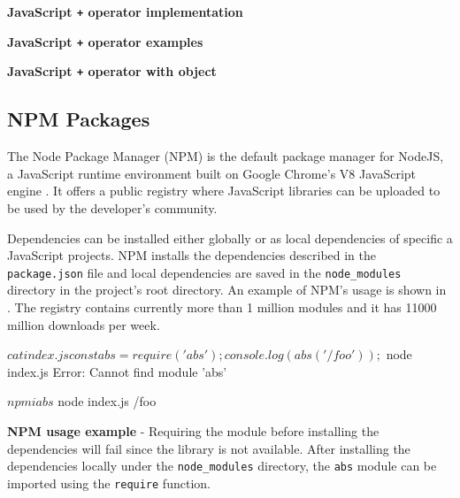 \begin{code}
	\captionsetup{aboveskip=0pt, belowskip=10pt}
	\caption[JavaScript + operator implementation]{\textbf{JavaScript \texttt{+} operator implementation}}
	\label{code:background-plus-operator-implementation}
\end{code}

\begin{code}
	\captionsetup{aboveskip=0pt, belowskip=10pt}
	\caption[JavaScript + operator examples]{\textbf{JavaScript \texttt{+} operator examples}}
	\label{code:background-plus-operator-simple-examples}
\end{code}

\begin{code}
	\captionsetup{aboveskip=0pt, belowskip=10pt}
	\caption[JavaScript + operator with object]{\textbf{JavaScript \texttt{+} operator with object}}
	\label{code:background-plus-operator-object-example}
\end{code}


\subsection{NPM Packages} \label{sec:background-npm-packages}
The Node Package Manager (NPM) is the default package manager for NodeJS, a JavaScript runtime environment built on Google Chrome's V8 JavaScript engine \citep{nodejs}. It offers a public registry where JavaScript libraries can be uploaded to be used by the developer's community.

Dependencies can be installed either globally or as local dependencies of specific a JavaScript projects. NPM installs the dependencies described in the \texttt{package.json} file and local dependencies are saved in the \texttt{node_modules} directory in the project's root directory. An example of NPM's usage is shown in . The registry contains currently more than 1 million modules and it has 11000 million downloads per week.

\begin{code}
	\begin{bashinline}
$ cat index.js 
const abs = require('abs');
console.log(abs('/foo'));

$ node index.js
Error: Cannot find module 'abs'

$ npm i abs
$ node index.js
/foo
	  \end{bashinline}
	\caption[NPM usage example]{\textbf{NPM usage example} - Requiring the module before installing the dependencies will fail since the library is not available. After installing the dependencies locally under the \texttt{node_modules} directory, the \texttt{abs} module can be imported using the \texttt{require} function.}
	\label{code:background-npm-usage-example}
  \end{code}


